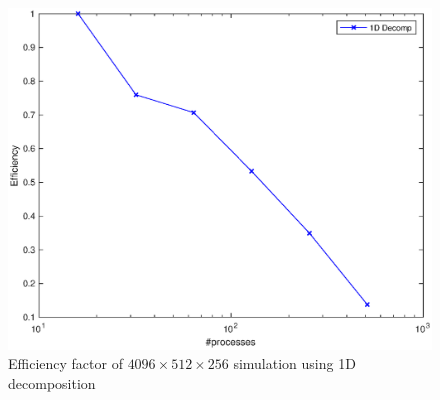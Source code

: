 \begin{figure}
\begin{center}
\includegraphics[scale=0.6]{grafici/20483}
\caption{Efficiency factor of $4096\times512 \times256$ simulation using 1D decomposition}
\label{20483}
\end{center}
\end{figure}


